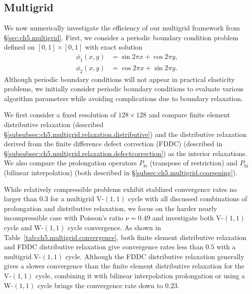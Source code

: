 \subsection{Multigrid} \label{subsec:ch5.examples.multigrid}

We now numerically investigate the efficiency of our multigrid framework from \S\ref{sec:ch5.multigrid}. First, we consider a periodic boundary condition problem defined on $[0,1] \times [0,1]$ with exact solution
\begin{align*}
\phi_1(x,y) & = \sin 2\pi x + \cos 2 \pi y, \\
\phi_2(x,y) & = \cos 2\pi x + \sin 2 \pi y.
\end{align*}
Although periodic boundary conditions will not appear in practical elasticity problems, we initially consider periodic boundary conditions to evaluate various algorithm parameters while avoiding complications due to boundary relaxation.

We first consider a fixed resolution of $128 \times 128$ and compare finite element distributive relaxation (described \S\ref{subsubsec:ch5.multigrid.relaxation.distributive}) and the distributive relaxation derived from the finite difference defect correction (FDDC) (described in \S\ref{subsubsec:ch5.multigrid.relaxation.defectcorrection}) as the interior relaxations. We also compare the prolongation operators $P_{\text{lo}}$ (transpose of restriction) and $P_{\text{hi}}$ (bilinear interpolation) (both described in \S\ref{subsec:ch5.multigrid.coarsening}).

While relatively compressible problems exhibit stablized convergence rates no larger than $0.3$ for a multigrid V-$(1,1)$ cycle with all discussed combinations of prolongation and distributive relaxation, we focus on the harder nearly incompressible case with Poisson's ratio $\nu = 0.49$ and investigate both V-$(1,1)$ cycle and W-$(1,1)$ cycle convergence. As shown in Table~\ref{tab:ch5.multigrid.convergence}, both finite element distributive relaxation and FDDC distributive relaxation give convergence rates less than $0.5$ with a multigrid V-$(1,1)$ cycle. Although the FDDC distributive relaxation generally gives a slower convergence than the finite element distributive relaxation for the V-$(1,1)$ cycle, combining it with bilinear interpolation prolongation or using a W-$(1,1)$ cycle brings the convergence rate down to $0.23$.

